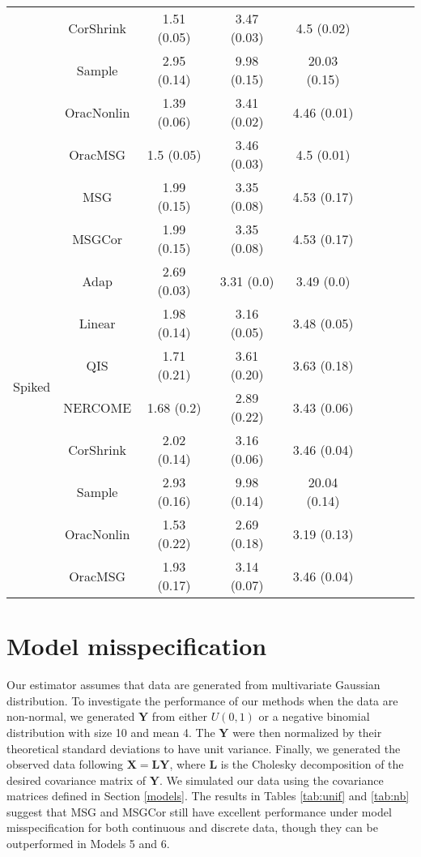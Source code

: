 \documentclass{article}
\def\bs{\mathbf}
\begin{document}
\begin{table}[H]
{\begin{tabular}{ccccccccc}
 & CorShrink      & 1.51 (0.05) & 3.47 (0.03) & 4.5 (0.02)   \\
 & Sample            & 2.95 (0.14) & 9.98 (0.15) & 20.03 (0.15) \\
 & OracNonlin & 1.39 (0.06) & 3.41 (0.02) & 4.46 (0.01)  \\
 & OracMSG  & 1.5 (0.05)  & 3.46 (0.03) & 4.5 (0.01) \\  \midrule
\multirow{10}{*}{Spiked}  
 & MSG & 1.99 (0.15) & 3.35 (0.08) & 4.53 (0.17)  \\
 & MSGCor   & 1.99 (0.15) & 3.35 (0.08) & 4.53 (0.17)  \\
 & Adap     & 2.69 (0.03) & 3.31 (0.0)  & 3.49 (0.0)   \\
 & Linear         & 1.98 (0.14) & 3.16 (0.05) & 3.48 (0.05)  \\
 & QIS            & 1.71 (0.21)  & 3.61 (0.20)  & 3.63 (0.18) \\
 & NERCOME        & 1.68 (0.2)  & 2.89 (0.22) & 3.43 (0.06)  \\
 & CorShrink      & 2.02 (0.14) & 3.16 (0.06) & 3.46 (0.04)  \\
 & Sample            & 2.93 (0.16) & 9.98 (0.14) & 20.04 (0.14) \\
 & OracNonlin & 1.53 (0.22) & 2.69 (0.18) & 3.19 (0.13)  \\
 & OracMSG  & 1.93 (0.17) & 3.14 (0.07) & 3.46 (0.04) \\ \bottomrule
\end{tabular}%
}
\end{table}

\section{Model misspecification}

Our estimator assumes that data are generated from multivariate Gaussian distribution. To investigate the performance of our methods when the data are non-normal, we generated $\bs{Y}$ from either $U(0, 1)$ or a negative binomial distribution with size 10 and mean 4. The $\bs{Y}$ were then normalized by their theoretical standard deviations to have unit variance. Finally, we generated the observed data following $\bs{X}=\bs{L}\bs{Y}$, where $\bs{L}$ is the Cholesky decomposition of the desired covariance matrix of $\bs{Y}$. We simulated our data using the covariance matrices defined in Section \ref{models}. The results in Tables \ref{tab:unif} and \ref{tab:nb} suggest that MSG and MSGCor still have excellent performance under model misspecification for both continuous and discrete data, though they can be outperformed in Models 5 and 6.
\end{document}
